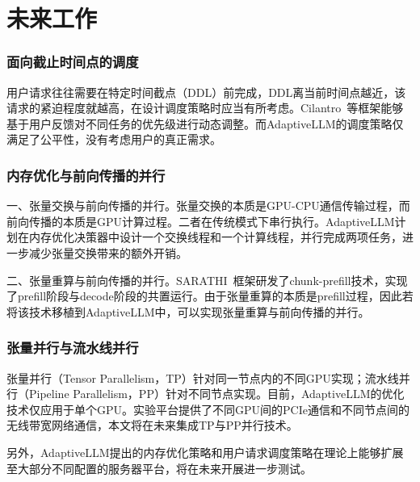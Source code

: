\section{未来工作}

\subsubsection{面向截止时间点的调度}

{\color{red}用户请求往往需要在特定时间截点（DDL）前完成，DDL离当前时间点越近，该请求的紧迫程度就越高，在设计调度策略时应当有所考虑。Cilantro~\cite{Cilantro}等框架能够基于用户反馈对不同任务的优先级进行动态调整。而AdaptiveLLM的调度策略仅满足了公平性，没有考虑用户的真正需求。}

\subsubsection{内存优化与前向传播的并行}

一、张量交换与前向传播的并行。张量交换的本质是GPU-CPU通信传输过程，而前向传播的本质是GPU计算过程。二者在传统模式下串行执行。AdaptiveLLM计划在内存优化决策器中设计一个交换线程和一个计算线程，并行完成两项任务，进一步减少张量交换带来的额外开销。

二、张量重算与前向传播的并行。SARATHI~\cite{SARATHI}框架研发了chunk-prefill技术，实现了prefill阶段与decode阶段的共置运行。由于张量重算的本质是prefill过程，因此若将该技术移植到AdaptiveLLM中，可以实现张量重算与前向传播的并行。

\subsubsection{张量并行与流水线并行} 

{\color{red}张量并行（Tensor Parallelism，TP）针对同一节点内的不同GPU实现；流水线并行（Pipeline Parallelism，PP）针对不同节点实现。目前，AdaptiveLLM的优化技术仅应用于单个GPU。实验平台提供了不同GPU间的PCIe通信和不同节点间的无线带宽网络通信，本文将在未来集成TP与PP并行技术。}

{\color{red}另外，AdaptiveLLM提出的内存优化策略和用户请求调度策略在理论上能够扩展至大部分不同配置的服务器平台，将在未来开展进一步测试。}

